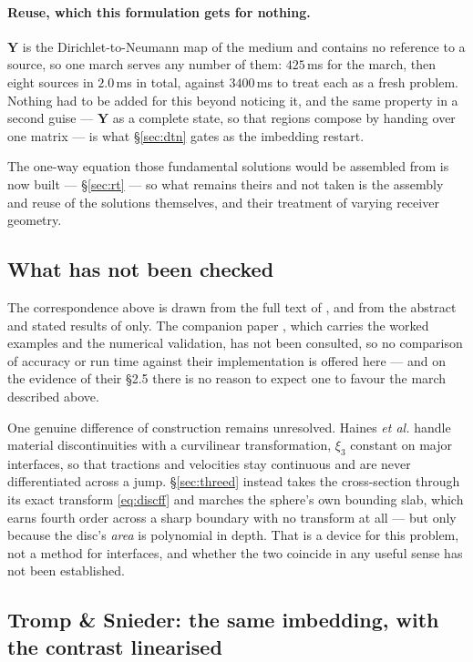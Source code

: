 \documentclass[11pt,a4paper]{article}
\newcommand{\bY}{\mathbf{Y}}
\begin{document}
\paragraph{Reuse, which this formulation gets for nothing.}  $\bY$ is the
Dirichlet-to-Neumann map of the medium and contains no reference to a source, so
one march serves any number of them: $425$\,ms for the march, then eight sources
in $2.0$\,ms in total, against $3400$\,ms to treat each as a fresh problem.
Nothing had to be added for this beyond noticing it, and the same property in a
second guise --- $\bY$ as a complete state, so that regions compose by handing
over one matrix --- is what \S\ref{sec:dtn} gates as the imbedding restart.

\medskip
\noindent
The one-way equation those fundamental solutions would be assembled from is
now built --- \S\ref{sec:rt} --- so what remains theirs and not taken is the
assembly and reuse of the solutions themselves, and their treatment of varying
receiver geometry.

\subsection{What has not been checked}

The correspondence above is drawn from the full text of \cite{haines2004}, and
from the abstract and stated results of \cite{thomson2015b} only.  The companion
paper \cite{hulme2004}, which carries the worked examples and the numerical
validation, has not been consulted, so no comparison of accuracy or run time
against their implementation is offered here --- and on the evidence of their
\S2.5 there is no reason to expect one to favour the march described above.

One genuine difference of construction remains unresolved.  Haines \emph{et al.}
handle material discontinuities with a curvilinear transformation, $\xi_3$
constant on major interfaces, so that tractions and velocities stay continuous
and are never differentiated across a jump.  \S\ref{sec:threed} instead takes
the cross-section through its exact transform \eqref{eq:discff} and marches the
sphere's own bounding slab, which earns fourth order across a sharp boundary
with no transform at all --- but only because the disc's \emph{area} is
polynomial in depth.  That is a device for this problem, not a method for
interfaces, and whether the two coincide in any useful sense has not been
established.

\subsection{Tromp \& Snieder: the same imbedding, with the contrast
linearised}\label{sec:trompsnieder}
\end{document}
